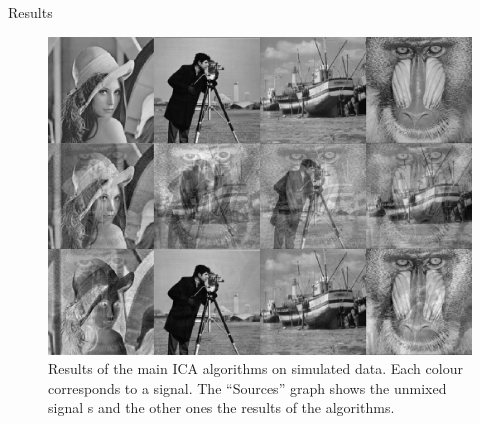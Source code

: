\documentclass{beamer}
\begin{document}
\begin{frame}{}
\begin{columns}[T]
\begin{column}{.48\linewidth}
\begin{block}{Results}
	\begin{figure}
	\includegraphics[width=\textwidth]{unmix_images}
\caption{Results of the main ICA algorithms on simulated data. Each colour corresponds to a signal. The ``Sources'' graph shows the unmixed signal    s and the other ones the results of the algorithms. \label{fig:res}}
\end{figure}
\end{block}

\end{column}
\end{columns}

\end{frame}
\end{document}
